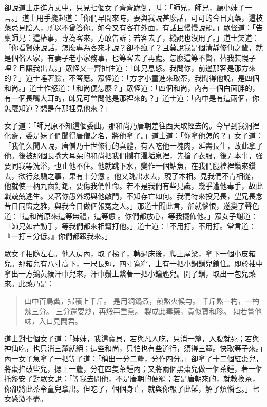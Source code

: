 卻說道士走進方丈中，只見七個女子齊齊跪倒，叫：「師兄，師兄，聽小妹子一言。」道士用手攙起道：「你們早間來時，要與我說甚麼話，可可的今日丸藥，這枝藥忌見陰人，所以不曾答你。如今又有客在外面，有話且慢慢說罷。」眾怪道：「告稟師兄：這樁事，專為客來，方敢告訴；若客去了，縱說也沒用了。」道士笑道：「你看賢妹說話，怎麼專為客來才說？卻不瘋了？且莫說我是個清靜修仙之輩，就是個俗人家，有妻子老小家務事，也等客去了再處。怎麼這等不賢，替我裝幌子哩？且讓我出去。」眾怪又一齊扯住道：「師兄息怒。我問你，前邊那客是那方來的？」道士唾著臉，不答應。眾怪道：「方才小童進來取茶，我聞得他說，是四個和尚。」道士作怒道：「和尚便怎麼？」眾怪道：「四個和尚，內有一個白面胖的，有一個長嘴大耳的，師兄可曾問他是那裡來的？」道士道：「內中是有這兩個，你怎麼知道？想是在那裡見他來？」

女子道：「師兄原不知這個委曲。那和尚乃唐朝差往西天取經去的。今早到我洞裡化齋，委是妹子們聞得唐僧之名，將他拿了。」道士道：「你拿他怎的？」女子道：「我們久聞人說，唐僧乃十世修行的真體，有人吃他一塊肉，延壽長生，故此拿了他。後被那個長嘴大耳朵的和尚把我們攔在濯垢泉裡，先搶了衣服，後弄本事，強要同我等洗浴，也止他不住。他就跳下水，變作一個鮎魚，在我們腿襠裡鑽來鑽去，欲行姦騙之事，果有十分憊𪬯。他又跳出水去，現了本相。見我們不肯相從，他就使一柄九齒釘鈀，要傷我們性命。若不是我們有些見識，幾乎遭他毒手，故此戰兢兢逃生。又著你愚外甥與他敵鬥，不知存亡如何。我們特來投兄長，望兄長念昔日同窗之雅，與我今日做個報冤之人。」那道士聞此言，卻就惱恨，遂變了聲色道：「這和尚原來這等無禮，這等憊𪬯。你們都放心，等我擺佈他。」眾女子謝道：「師兄如若動手，等我們都來相幫打他。」道士道：「不用打，不用打。常言道：『一打三分低。』你們都跟我來。」

眾女子相隨左右。他入房內，取了梯子，轉過床後，爬上屋梁，拿下一個小皮箱兒。那箱兒有八寸高下，一尺長短，四寸寬窄，上有一把小銅鎖兒鎖住。即於袖中拿出一方鵝黃綾汗巾兒來，汗巾鬚上繫著一把小鑰匙兒。開了鎖，取出一包兒藥來。此藥乃是：
\begin{quote}
山中百鳥糞，掃積上千斤。
是用銅鍋煮，煎熬火候勻。
千斤熬一杓，一杓煉三分。
三分還要炒，再煅再重熏。
製成此毒藥，貴似寶和珍。
如若嘗他味，入口見閻君。
\end{quote}

道士對七個女子道：「妹妹，我這寶貝，若與凡人吃，只消一釐，入腹就死；若與神仙吃，也只消三釐就絕；這些和尚，只怕也有些道行，須得三釐。快取等子來。」內一女子急拿了一把等子道：「稱出一分二釐，分作四分。」卻拿了十二個紅棗兒，將棗掐破些兒，揌上一釐，分在四隻茶鍾內；又將兩個黑棗兒做一個茶鍾，著一個托盤安了對眾女說：「等我去問他，不是唐朝的便罷；若是唐朝來的，就教換茶，你卻將此茶令童兒拿出。但吃了，個個身亡，就與你報了此讎，解了煩惱也。」七女感激不盡。

